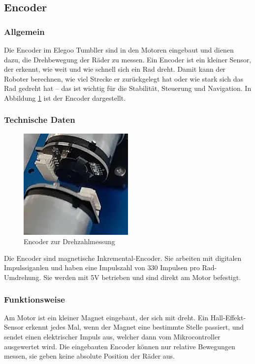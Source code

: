 %
\subsection{Encoder}
\subsubsection{Allgemein}
Die Encoder im Elegoo Tumbller sind in den Motoren eingebaut und dienen dazu,
die Drehbewegung der Räder zu messen.
%
Ein Encoder ist ein kleiner Sensor, der erkennt, wie weit und wie schnell sich ein Rad dreht.
%
Damit kann der Roboter berechnen,
wie viel Strecke er zurückgelegt hat oder wie stark sich das Rad gedreht hat --
das ist wichtig für die Stabilität, Steuerung und Navigation.
%
In Abbildung \ref{fig:encoder} ist der Encoder dargestellt.

\subsubsection{Technische Daten}
\begin{figure}[H]
    \centering
    \includegraphics[width=0.5\textwidth]{img/Hardware/encoder.png}
    \caption{Encoder zur Drehzahlmessung}
    \label{fig:encoder}
\end{figure}
Die Encoder sind magnetische Inkremental-Encoder.
Sie arbeiten mit digitalen Impulssiganlen und haben eine Impulszahl von 330 Impulsen pro Rad-Umdrehung.
%
Sie werden mit 5V betrieben und sind direkt am Motor befestigt.
\subsubsection{Funktionsweise}
Am Motor ist ein kleiner Magnet eingebaut,
der sich mit dreht.
%
Ein Hall-Effekt-Sensor erkennt jedes Mal,
wenn der Magnet eine bestimmte Stelle passiert,
und sendet einen elektrischer Impuls aus,
welcher dann vom Mikrocontroller ausgewertet wird.
%
Die eingebauten Encoder können nur relative Bewegungen messen,
sie geben keine absolute Position der Räder aus.
%
